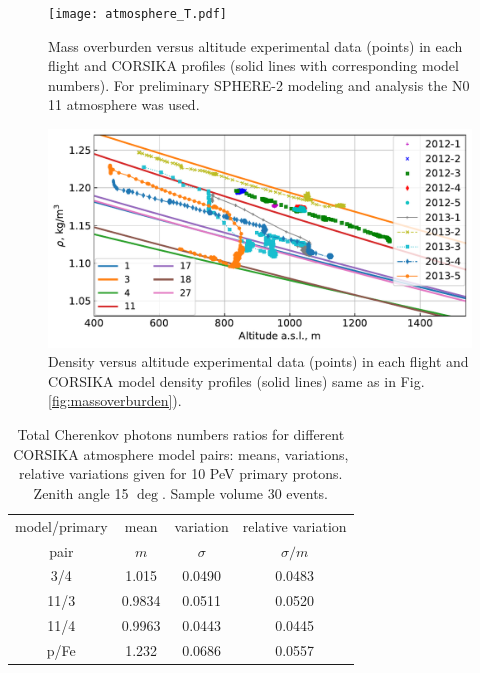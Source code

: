 \documentclass[preprint,5p,times]{elsarticle}
\begin{document}
\begin{figure}[bt]
\centering
\begin{minipage}[t]{0.48\textwidth}
    \texttt{[image: atmosphere\_T.pdf]}
    \vspace{-1.0pc}
    \caption{Mass overburden versus altitude experimental data (points) in each flight and CORSIKA profiles (solid lines with corresponding model numbers). For preliminary SPHERE-2 modeling and analysis the N0 11 atmosphere was used.}
\label{fig:massoverburden}
\end{minipage}
\vfill
\vspace{1pc}
\begin{minipage}[t]{0.48\textwidth}
    \includegraphics[width=\textwidth]{atmosphere_rho.pdf}
    \vspace{-1.0pc}
    \caption{Density versus altitude experimental data (points) in each flight and CORSIKA model density profiles (solid lines) same as in Fig. \ref{fig:massoverburden}).}
\label{fig:density}
\end{minipage}
\end{figure}




\begin{table}[t]
\centering
\caption{Total Cherenkov photons numbers ratios for different CORSIKA atmosphere model pairs: means, variations, relative variations given for 10 PeV primary protons. Zenith angle 15 $\deg$. Sample volume 30 events.}
\label{tab:atmmod}
\vspace{1pc}
\begin{tabular}{|c|c|c|c|}
\hline
model/primary   & mean &  variation   & relative variation \\ 
     pair       &  $m$ & $\sigma$     & $\sigma/m$          \\ 
\hline 
\hline 
 3/4 &  1.015    &  0.0490     &   0.0483   \\
\hline
11/3 &  0.9834    &  0.0511     &   0.0520    \\
\hline
11/4 &  0.9963    &  0.0443     &   0.0445    \\
\hline
\hline
p/Fe &  1.232     &  0.0686     &   0.0557     \\
\hline
\end{tabular}
\end{table}
\end{document}

